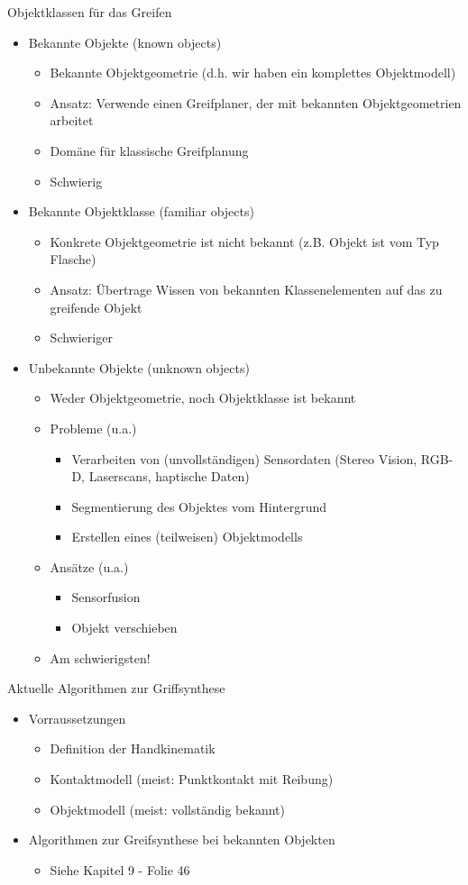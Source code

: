 \documentclass[paper=a4, fontsize=11pt]{scrartcl} %
\numberwithin{equation}{section} %
\numberwithin{figure}{section} %
\numberwithin{table}{section} %
\begin{document}
Objektklassen für das Greifen
\begin{itemize}
\item Bekannte Objekte (known objects)
\begin{itemize}
\item Bekannte Objektgeometrie (d.h. wir haben ein komplettes Objektmodell)
\item Ansatz: Verwende einen Greifplaner, der mit bekannten Objektgeometrien arbeitet
\item Domäne für klassische Greifplanung
\item Schwierig
\end{itemize}
\item Bekannte Objektklasse (familiar objects)
\begin{itemize}
\item Konkrete Objektgeometrie ist nicht bekannt (z.B. \glqq Objekt ist vom Typ Flasche\grqq)
\item Ansatz: Übertrage Wissen von bekannten Klassenelementen auf das zu greifende Objekt
\item Schwieriger
\end{itemize}
\item Unbekannte Objekte (unknown objects)
\begin{itemize}
\item Weder Objektgeometrie, noch Objektklasse ist bekannt
\item Probleme (u.a.)
\begin{itemize}
\item Verarbeiten von (unvollständigen) Sensordaten (Stereo Vision, RGB-D, Laserscans, haptische Daten)
\item Segmentierung des Objektes vom Hintergrund
\item Erstellen eines (teilweisen) Objektmodells
\end{itemize}
\item Ansätze (u.a.)
\begin{itemize}
\item Sensorfusion
\item Objekt verschieben
\end{itemize}
\item Am schwierigsten!
\end{itemize}
\end{itemize}

Aktuelle Algorithmen zur Griffsynthese
\begin{itemize}
\item Vorraussetzungen
\begin{itemize}
\item Definition der Handkinematik
\item Kontaktmodell (meist: Punktkontakt mit Reibung)
\item Objektmodell (meist: vollständig bekannt)
\end{itemize}
\item Algorithmen zur Greifsynthese bei bekannten Objekten
\begin{itemize}
\item Siehe Kapitel 9 - Folie 46
\end{itemize}
\end{itemize}
\end{document}
